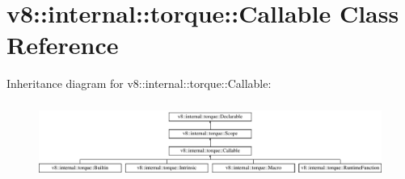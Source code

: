 \hypertarget{classv8_1_1internal_1_1torque_1_1Callable}{}\section{v8\+:\+:internal\+:\+:torque\+:\+:Callable Class Reference}
\label{classv8_1_1internal_1_1torque_1_1Callable}
Inheritance diagram for v8\+:\+:internal\+:\+:torque\+:\+:Callable\+:\begin{figure}[H]
\begin{center}
\leavevmode
\includegraphics[height=2.522522cm]{classv8_1_1internal_1_1torque_1_1Callable}
\end{center}
\end{figure}
